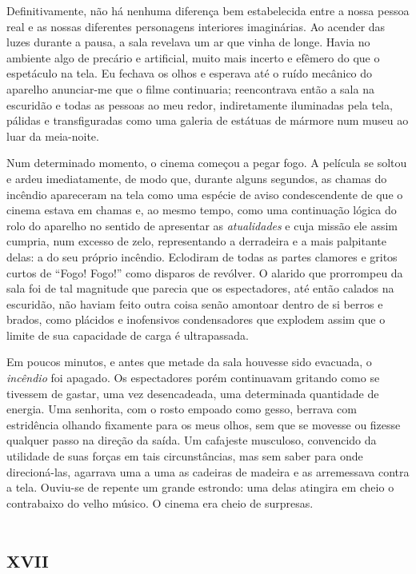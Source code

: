Definitivamente, não há nenhuma diferença bem estabelecida entre a nossa pessoa real e as nossas diferentes personagens interiores imaginárias. Ao acender das luzes durante a pausa, a sala revelava um ar que vinha de longe. Havia no ambiente algo de precário e artificial, muito mais incerto e efêmero do que o espetáculo na tela. Eu fechava os olhos e esperava até o ruído mecânico do aparelho anunciar-me que o filme continuaria; reencontrava então a sala na escuridão e todas as pessoas ao meu redor, indiretamente iluminadas pela tela, pálidas e transfiguradas como uma galeria de estátuas de mármore num museu ao luar da meia-noite.

Num determinado momento, o cinema começou a pegar fogo. A película se soltou e ardeu imediatamente, de modo que, durante alguns segundos, as chamas do incêndio apareceram na tela como uma espécie de aviso condescendente de que o cinema estava em chamas e, ao mesmo tempo, como uma continuação lógica do rolo do aparelho no sentido de apresentar as \textit{atualidades} e cuja missão ele assim cumpria, num excesso de zelo, representando a derradeira e a mais palpitante delas: a do seu próprio incêndio. Eclodiram de todas as partes clamores e gritos curtos de ``Fogo! Fogo!'' como disparos de revólver. O alarido que prorrompeu da sala foi de tal magnitude que parecia que os espectadores, até então calados na escuridão, não haviam feito outra coisa senão amontoar dentro de si berros e brados, como plácidos e inofensivos condensadores que explodem assim que o limite de sua capacidade de carga é ultrapassada.

Em poucos minutos, e antes que metade da sala houvesse sido evacuada, o \textit{incêndio} foi apagado. Os espectadores porém continuavam gritando como se tivessem de gastar, uma vez desencadeada, uma determinada quantidade de energia. Uma senhorita, com o rosto empoado como gesso, berrava com estridência olhando fixamente para os meus olhos, sem que se movesse ou fizesse qualquer passo na direção da saída. Um cafajeste musculoso, convencido da utilidade de suas forças em tais circunstâncias, mas sem saber para onde direcioná-las, agarrava uma a uma as cadeiras de madeira e as arremessava contra a tela. Ouviu-se de repente um grande estrondo: uma delas atingira em cheio o contrabaixo do velho músico. O cinema era cheio de surpresas.


\chapter*{\huge\centering\textsc{xvii}}

